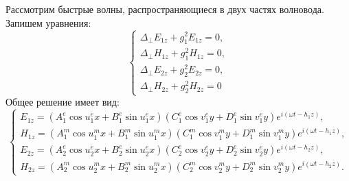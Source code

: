     Рассмотрим быстрые волны, распространяющиеся в двух частях волновода.
    Запишем уравнения:
    \[
        \left\{
        \begin{array}{l}
            \Delta_\perp E_{1z} + g_1^2 E_{1z} = 0,\\
            \Delta_\perp H_{1z} + g_1^2 H_{1z} = 0,\\
            \Delta_\perp E_{2z} + g_2^2 E_{2z} = 0,\\
            \Delta_\perp H_{2z} + g_2^2 H_{2z} = 0
        \end{array}
        \right.
    \]
    Общее решение имеет вид:
    \[
        \left\{
        \begin{array}{l}
            E_{1z} =
            (A^e_1\cos u^e_1 x + B^e_1\sin u^e_1 x)
            (C^e_1\cos v^e_1 y + D^e_1\sin v^e_1 y)
            e^{i(\omega t - h_1 z)}, \\
            H_{1z} =
            (A^m_1\cos u^m_1 x + B^m_1\sin u^m_1 x)
            (C^m_1\cos v^m_1 y + D^m_1\sin v^m_1 y)
            e^{i(\omega t - h_1 z)}, \\
            E_{2z} =
            (A^e_2\cos u^e_2 x + B^e_2\sin u^e_2 x)
            (C^e_2\cos v^e_2 y + D^e_2\sin v^e_2 y)
            e^{i(\omega t - h_2 z)}, \\
            H_{2z} =
            (A^m_2\cos u^m_2 x + B^m_2\sin u^m_2 x)
            (C^m_2\cos v^m_2 y + D^m_2\sin v^m_2 y)
            e^{i(\omega t - h_2 z)}.
        \end{array}
        \right.
    \]
